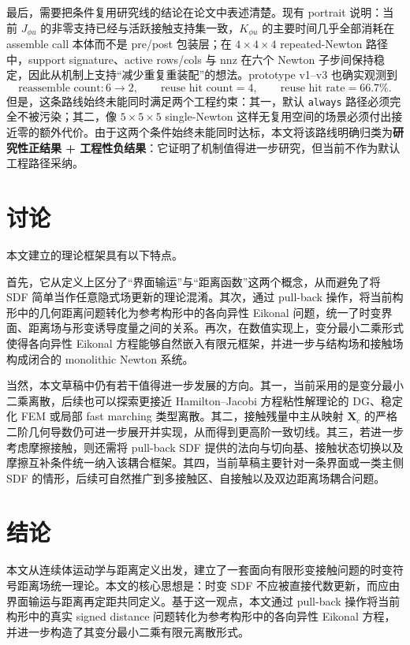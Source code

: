 \documentclass[12pt,a4paper]{ctexart}
\numberwithin{equation}{section}
\newcommand{\bX}{\bm{X}}
\begin{document}
最后，需要把条件复用研究线的结论在论文中表述清楚。现有 portrait 说明：当前 $J_{\phi u}$ 的非零支持已经与活跃接触支持集一致，$K_{\phi u}$ 的主要时间几乎全部消耗在 assemble call 本体而不是 pre/post 包装层；在 $4\times4\times4$ repeated-Newton 路径中，support signature、active rows/cols 与 nnz 在六个 Newton 子步间保持稳定，因此从机制上支持“减少重复重装配”的想法。prototype v1--v3 也确实观测到
\[
\text{reassemble count}: 6 \rightarrow 2,\qquad
\text{reuse hit count}=4,\qquad
\text{reuse hit rate}=66.7\%.
\]
但是，这条路线始终未能同时满足两个工程约束：其一，默认 \texttt{always} 路径必须完全不被污染；其二，像 $5\times5\times5$ single-Newton 这样无复用空间的场景必须付出接近零的额外代价。由于这两个条件始终未能同时达标，本文将该路线明确归类为\textbf{研究性正结果 + 工程性负结果}：它证明了机制值得进一步研究，但当前不作为默认工程路径采纳。

\section{讨论}\label{sec:discussion}

本文建立的理论框架具有以下特点。

首先，它从定义上区分了``界面输运''与``距离函数''这两个概念，从而避免了将 SDF 简单当作任意隐式场更新的理论混淆。其次，通过 pull-back 操作，将当前构形中的几何距离问题转化为参考构形中的各向异性 Eikonal 问题，统一了时变界面、距离场与形变诱导度量之间的关系。再次，在数值实现上，变分最小二乘形式使得各向异性 Eikonal 方程能够自然嵌入有限元框架，并进一步与结构场和接触场构成闭合的 monolithic Newton 系统。

当然，本文草稿中仍有若干值得进一步发展的方向。其一，当前采用的是变分最小二乘离散，后续也可以探索更接近 Hamilton--Jacobi 方程粘性解理论的 DG、稳定化 FEM 或局部 fast marching 类型离散。其二，接触残量中主从映射 $\bX_c$ 的严格二阶几何导数仍可进一步展开并实现，从而得到更高阶一致切线。其三，若进一步考虑摩擦接触，则还需将 pull-back SDF 提供的法向与切向基、接触状态切换以及摩擦互补条件统一纳入该耦合框架。其四，当前草稿主要针对一条界面或一类主侧 SDF 的情形，后续可自然推广到多接触区、自接触以及双边距离场耦合问题。

\section{结论}\label{sec:conclusion}

本文从连续体运动学与距离定义出发，建立了一套面向有限形变接触问题的时变符号距离场统一理论。本文的核心思想是：时变 SDF 不应被直接代数更新，而应由界面输运与距离再定距共同定义。基于这一观点，本文通过 pull-back 操作将当前构形中的真实 signed distance 问题转化为参考构形中的各向异性 Eikonal 方程，并进一步构造了其变分最小二乘有限元离散形式。
\end{document}
